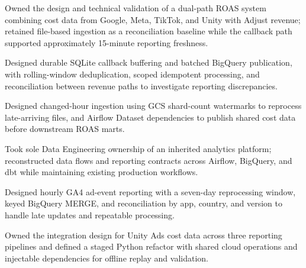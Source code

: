
\begin{cvbullets}
  \item Owned the design and technical validation of a dual-path ROAS
    system combining cost data from Google, Meta, TikTok, and Unity with
    Adjust revenue; retained file-based ingestion as a reconciliation baseline
    while the
    callback path supported approximately 15-minute reporting freshness.
  \item Designed durable SQLite callback buffering and batched BigQuery
    publication, with rolling-window deduplication, scoped idempotent
    processing, and reconciliation between revenue paths to investigate
    reporting discrepancies.
  \item Designed changed-hour ingestion using GCS shard-count watermarks
    to reprocess late-arriving files, and Airflow Dataset dependencies to
    publish shared cost data before downstream ROAS marts.
\end{cvbullets}
\begin{cvbullets}
  \item Took sole Data Engineering ownership of an inherited analytics
    platform; reconstructed data flows and reporting contracts across
    Airflow, BigQuery, and dbt while maintaining existing production
    workflows.
  \item Designed hourly GA4 ad-event
    reporting with a seven-day reprocessing window, keyed BigQuery MERGE,
    and reconciliation by app, country, and version to handle late updates
    and repeatable processing.
  \item Owned the integration design for Unity Ads cost data across three
    reporting pipelines and defined a staged Python refactor with shared cloud operations and
    injectable dependencies for offline replay and validation.
\end{cvbullets}

